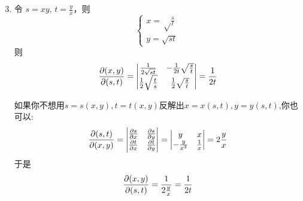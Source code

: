 \begin{solution}
    \begin{enumerate}
        \setcounter{enumi}{2}
        \item 令 $s = xy,\, t = \frac{y}{x}$，则
        $$
        \begin{cases}
            x = \sqrt \frac{s}{t}\\
            y = \sqrt{st}
        \end{cases}
        $$
        则
        \[
        \pdv{(x, y)}{(s, t)} = 
        \begin{vmatrix}
        \frac{1}{2\sqrt{st}} & -\frac{1}{2t}\sqrt{\frac{s}{t}} \\
        \frac{1}{2}\sqrt{\frac{t}{s}} & \frac{1}{2}\sqrt{\frac{s}{t}}
        \end{vmatrix}
        = \frac{1}{2t}
        \]

        \begin{remark}
            如果你不想用$s=s(x,y),t=t(x,y)$反解出$x=x(s,t),y=y(s,t)$,你也可以:
            $$
            \pdv{(s,t)}{(x,y)} = 
            \begin{vmatrix}
                \pdv{s}{x} & \pdv{s}{y} \\
                \pdv{t}{x} & \pdv{t}{y} 
            \end{vmatrix}=
            \begin{vmatrix}
                y & x \\
                -\frac{y}{x^2} & \frac{1}{x}
            \end{vmatrix} = 2 \frac{y}{x}
            $$
            于是
            $$
            \pdv{(x,y)}{(s,t)} = \frac{1}{2 \frac{y}{x}} = \frac{1}{2t}
            $$
        \end{remark}
        

\end{enumerate}
\end{solution}
